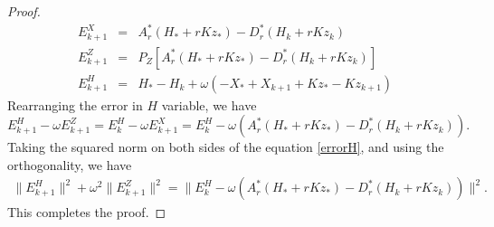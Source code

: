 \begin{proof}
\begin{eqnarray*}
E_{k+1}^X &=& A_r^{*} (H_* + r K z_*) - D_r^{*} (H_k + r K z_k) \\
E_{k+1}^Z &=& P_Z [ A_r^{*} (H_* + rK z_*) - D_r^{*} (H_k + rK z_k) ] \\
E_{k+1}^H &=& H_* - H_k + \omega (-X_* + X_{k+1} + Kz_{*} - K z_{k+1})
\end{eqnarray*}
Rearranging the error in $H$ variable, we have 
\begin{equation}\label{errorH}
E_{k+1}^H - \omega E_{k+1}^Z = E_k^H - \omega E_{k+1}^X = E_k^H - \omega \left( A_r^{*} (H_* + r K z_*) - D_r^{*} (H_k + r K z_k) \right).    
\end{equation}
Taking the squared norm on both sides of the equation \eqref{errorH}, and using the orthogonality, we have 
\begin{eqnarray*}
\|E_{k+1}^H\|^2 + \omega^2 \|E_{k+1}^Z\|^2 = \|E_k^H - \omega (A_r^{*} (H_* + r K z_*) - D_r^{*} (H_k + r K z_k))\|^2. 
\end{eqnarray*}
This completes the proof. 



\end{proof}
